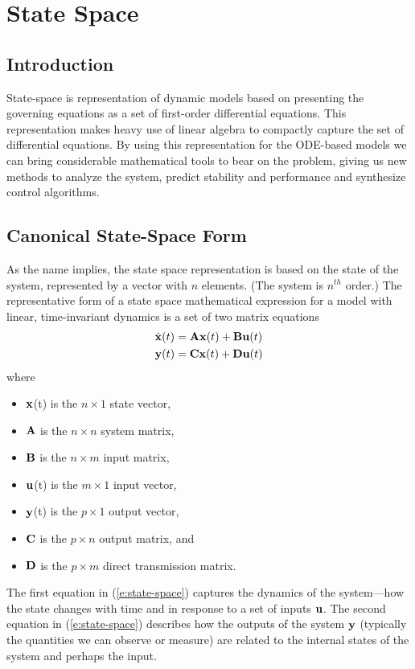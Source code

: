 \chapter{State Space}\label{c:statespace}
\section{Introduction}
State-space is representation of dynamic models based on presenting the governing equations as a set of first-order differential equations.  This representation makes heavy use of linear algebra to compactly capture the set of differential equations.  By using this representation for the ODE-based models we can bring considerable mathematical tools to bear on the problem, giving us new methods to analyze the system, predict stability and performance and synthesize control algorithms.


\section{Canonical State-Space Form}
As the name implies, the state space representation is based on the state of the system, represented by a vector with $n$ elements. (The system is $n^{th}$ order.)  The representative form of a state space mathematical expression for a model with linear, time-invariant dynamics is a set of two matrix equations
\begin{align}\label{e:state-space}
\dot{\mbox{${\bf x}$}}(t) & = \mbox{${\bf A}$} \mbox{${\bf x}$}(t) + \mbox{${\bf B}$}\mbox{${\bf u}$}(t) \nonumber \\
\mbox{${\bf y}$}(t) & = \mbox{${\bf C}$}\mbox{${\bf x}$}(t) + \mbox{${\bf D}$}\mbox{${\bf u}$}(t)
\end{align}
where
\begin{itemize}
\item $\mbox{${\bf x}$}$(t) is the $n \times 1$ state vector,
\item $\mbox{${\bf A}$}$ is the $n \times n$ system matrix,
\item $\mbox{${\bf B}$}$ is the $n \times m$ input matrix,
\item $\mbox{${\bf u}$}$(t) is the $m \times 1$ input vector,
\item $\mbox{${\bf y}$}$(t) is the $p \times 1$ output vector,
\item $\mbox{${\bf C}$}$ is the $p \times n$ output matrix, and
\item $\mbox{${\bf D}$}$ is the $p \times m$ direct transmission matrix.
\end{itemize}
The first equation in (\ref{e:state-space}) captures the dynamics of the system---how the state changes with time and in response to a set of inputs $\mbox{${\bf u}$}$.  The second equation in (\ref{e:state-space}) describes how the outputs of the system $\mbox{${\bf y}$}$ (typically the quantities we can observe or measure) are related to the internal states of the system and perhaps the input.

